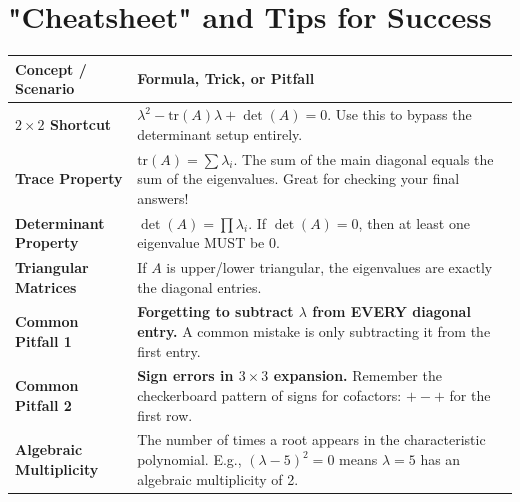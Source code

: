 \documentclass[11pt, a4paper]{article}
\theoremstyle{definition}
\theoremstyle{remark}
\begin{document}
\newpage
\section{"Cheatsheet" and Tips for Success}

\renewcommand{\arraystretch}{1.5}
\begin{tabularx}{\textwidth}{l X}
\toprule
\textbf{Concept / Scenario} & \textbf{Formula, Trick, or Pitfall} \\
\midrule
\textbf{$2 \times 2$ Shortcut} & $\displaystyle \lambda^2 - \text{tr}(A)\lambda + \det(A) = 0$. Use this to bypass the determinant setup entirely. \\
\addlinespace[4pt]
\textbf{Trace Property} & $\displaystyle \text{tr}(A) = \sum \lambda_i$. The sum of the main diagonal equals the sum of the eigenvalues. Great for checking your final answers! \\
\addlinespace[4pt]
\textbf{Determinant Property} & $\displaystyle \det(A) = \prod \lambda_i$. If $\det(A) = 0$, then at least one eigenvalue MUST be $0$. \\
\addlinespace[4pt]
\textbf{Triangular Matrices} & If $A$ is upper/lower triangular, the eigenvalues are exactly the diagonal entries. \\
\addlinespace[4pt]
\textbf{Common Pitfall 1} & \textbf{Forgetting to subtract $\lambda$ from EVERY diagonal entry.} A common mistake is only subtracting it from the first entry. \\
\addlinespace[4pt]
\textbf{Common Pitfall 2} & \textbf{Sign errors in $3 \times 3$ expansion.} Remember the checkerboard pattern of signs for cofactors: $+ - +$ for the first row. \\
\addlinespace[4pt]
\textbf{Algebraic Multiplicity} & The number of times a root appears in the characteristic polynomial. E.g., $(\lambda - 5)^2 = 0$ means $\lambda=5$ has an algebraic multiplicity of 2. \\
\bottomrule
\end{tabularx}

\vspace{1cm}
\end{document}
